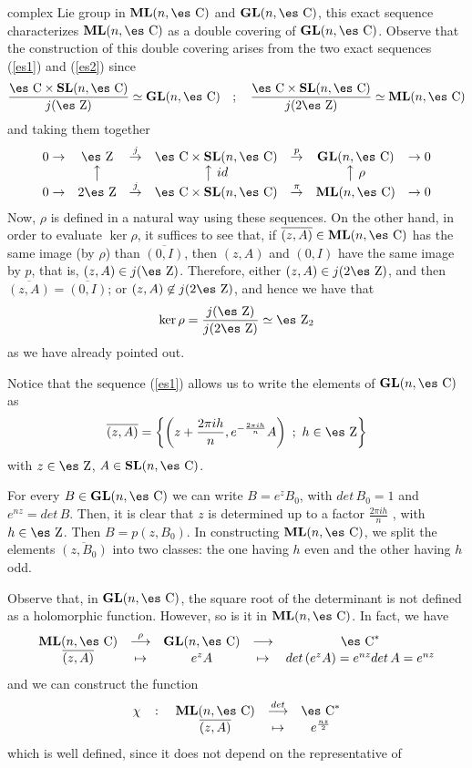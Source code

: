 \documentclass[12pt]{article}
\theoremstyle{plain}
\def\dst{\(}
\def\map#1{\mathrel{\mathop{\to}\limits^{#1}}}
\def\mapping#1{\mathrel{\mathop{\longrightarrow}\limits^{#1}}}
\def\GL{{\bf GL}(n,\Complex )}
\def\SL{{\bf SL}(n,\Complex )}
\def\ML{{\bf ML}(n,\Complex )}
\def\Zahl{\mbox{\es Z}}
\def\Complex{\mbox{\es C}}
\begin{document}
complex Lie group in $\ML$ and $\GL$, this exact sequence
characterizes $\ML$ as a double covering of $\GL$. Observe that
the construction of this double covering arises from the two exact
sequences (\ref{es1}) and (\ref{es2}) since $$ \frac{\Complex
\times \SL}{j(\Zahl)} \simeq \GL \quad ; \quad \frac{\Complex
\times \SL}{j(2\Zahl)} \simeq \ML $$ and taking them together
$$\begin{array}{ccccccc} 0 \map{} &\Zahl& \map{j} &\Complex \times
\SL& \map{p} &\GL& \map{} 0
\\
&\big\uparrow& &\big\uparrow\ id & &\big\uparrow\ \rho &
\\
0 \map{} &2\Zahl& \map{j} &\Complex \times \SL & \map{\pi} &\ML& \map{}
0
\end{array}$$
Now, $\rho$ is defined in a natural way using these sequences.
On the other hand, in order to evaluate $\ker \rho$,
it suffices to see that, if $\overline{(z,A)} \in \ML$
has the same image (by $\rho$) than $\overline{(0,I)}$, then
$(z,A)$ and $(0,I)$ have the same image by $p$, that is,
$(z,A) \in j(\Zahl)$. Therefore, either $(z,A) \in j(2\Zahl)$,
and then $\overline{(z,A)} = \overline{(0,I)}$; or
$(z,A) \not\in j(2\Zahl)$, and hence we have that
$$
\ker \rho = \frac{j(\Zahl)}{j(2\Zahl)} \simeq \Zahl_2
$$
as we have already pointed out.

Notice that the sequence (\ref{es1}) allows us to write the elements of
$\GL$ as
 $$
 \overline{(z,A)} =
 \left\{ \left(z + \frac{2\pi i h}{n},e^{-\frac{2\pi i h}{n}}A \right)
 \ ; \ h \in \Zahl \right\}
 $$
with $z \in \Zahl$, $A \in \SL$.

For every $B \in \GL$ we can write $B = e^{z}B_0$,
with $det\, B_0=1$ and $e^{nz}=det\, B$.
Then, it is clear that $z$ is determined up to a factor
\dst\frac{2\pi i h}{n}\) , with $h\in\Zahl$. Then $B = p(z,B_0)$.
In constructing $\ML$, we split the elements $\overline{(z,B_0)}$
into two classes: the one having $h$ even and the other having $h$ odd.

Observe that,
in $\GL$, the square root of the determinant is not defined as a
holomorphic function.
However, so is it in $\ML$. In fact, we have
$$
\begin{array}{ccccc}
\ML &\mapping{\rho}& \GL &\longrightarrow& \Complex^*
\\
\overline{(z,A)} &\mapsto& e^{z}A &\mapsto&
det\, (e^{z}A) = e^{nz} det\, A = e^{nz}
\end{array}
$$
and we can construct the function
$$
\begin{array}{ccccc}
\chi &\colon &\ML& \mapping{det} & \Complex^*
\\
& & \overline{(z,A)} & \mapsto & e^{\frac{nz}{2}}
\end{array}
$$
which is well defined, since it does not depend on the representative of
\end{document}
